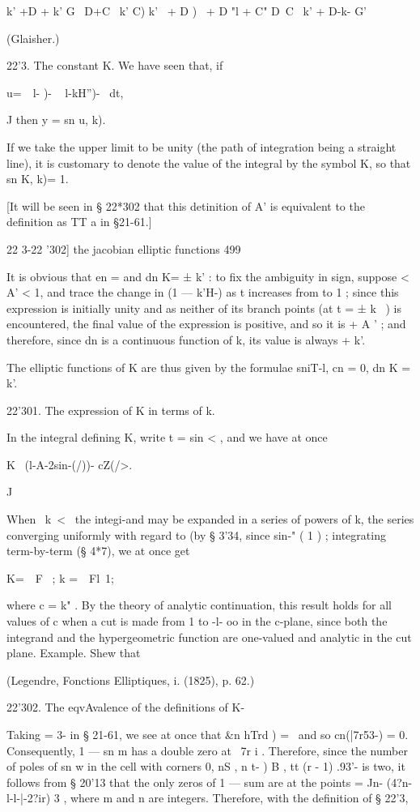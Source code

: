 k' +D + k' G \ D+C \ k' C) k' \ + D ) \ + D "l + C" D~C ~k' + D-k- G'

(Glaisher.)

22'3. The constant K. We have seen that, if

u=\ \ l- )- ~ l-kH'')- ~dt,

J then y = sn u, k).

If we take the upper limit to be unity (the path of integration being
a straight line), it is customary to denote the value of the integral
by the symbol K, so that sn K, k)= 1.

[It will be seen in § 22*302 that this detinition of A' is equivalent
to the definition as TT a in §21-61.]

22 3-22 '302] the jacobian elliptic functions 499

It is obvious that en = and dn K= ± k' : to fix the ambiguity in sign,
suppose < A' < 1, and trace the change in (1 — k'H-) as t increases
from to 1 ; since this expression is initially unity and as neither of
its branch points (at t = ± k~ ) is encountered, the final value of
the expression is positive, and so it is + A ' ; and therefore, since
dn is a continuous function of k, its value is always + k'.

The elliptic functions of K are thus given by the formulae sniT-l, cn
= 0, dn K = k'.

22'301. The expression of K in terms of k.

In the integral defining K, write t = sin < , and we have at once

K \ (l-A-2sin-(/))- cZ(/>.

J

When \ k\ < \, the integi-and may be expanded in a series of powers of
k, the series converging uniformly with regard to (by § 3'34, since
sin-" ( 1 ) ; integrating term-by-term (§ 4*7), we at once get

K=\ \ F \, ; k =\ \ Fl\, 1;

where c = k" . By the theory of analytic continuation, this result
holds for all values of c when a cut is made from 1 to -l- oo in the
c-plane, since both the integrand and the hypergeometric function are
one-valued and analytic in the cut plane. Example. Shew that

(Legendre, Fonctions Elliptiques, i. (1825), p. 62.)

22'302. The eqvAvalence of the definitions of K-

Taking = 3- in § 21-61, we see at once that \&n hTrd ) = \ and so
cn(|7r53-) = 0. Consequently, 1 — sn m has a double zero at \ 7r i .
Therefore, since the number of poles of sn w in the cell with corners
0, nS , n t- ) B , tt (r - 1) .93'- is two, it follows from § 20'13
that the only zeros of 1 — sum are at the points = Jn-
(4?n-l-l-|-2?ir) 3 , where m and n are integers. Therefore, with the
definition of § 22'3,


